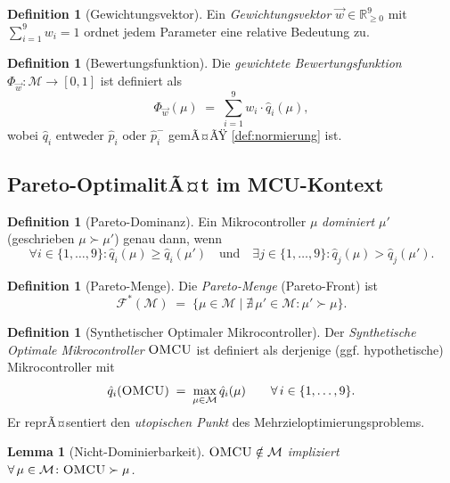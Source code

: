﻿\documentclass[12pt, a4paper]{article}
\theoremstyle{plain}
\newtheorem{lemma}[theorem]{Lemma}
\theoremstyle{definition}
\newtheorem{definition}[theorem]{Definition}
\theoremstyle{remark}
\newcommand{\omcu}{\textsc{OMCU}}
\newcommand{\RR}{\mathbb{R}}
\begin{document}
\begin{definition}[Gewichtungsvektor]
\label{def:gewichtung}
  Ein \emph{Gewichtungsvektor} $\vec{w} \in \RR_{\ge 0}^9$ mit
  $\sum_{i=1}^{9} w_i = 1$ ordnet jedem Parameter eine relative Bedeutung zu.
\end{definition}

\begin{definition}[Bewertungsfunktion]
\label{def:bewertung}
  Die \emph{gewichtete Bewertungsfunktion} $\Phi_{\vec{w}} \colon
  \mathcal{M} \to [0,1]$ ist definiert als
  \[
    \Phi_{\vec{w}}(\mu) \;=\;
    \sum_{i=1}^{9} w_i \cdot \hat{q}_i(\mu),
  \]
  wobei $\hat{q}_i$ entweder $\hat{p}_i$ oder $\hat{p}_i^{-}$ gemÃ¤ÃŸ
  \cref{def:normierung} ist.
\end{definition}

\subsection{Pareto-OptimalitÃ¤t im MCU-Kontext}

\begin{definition}[Pareto-Dominanz]
\label{def:pareto-dominanz}
  Ein Mikrocontroller $\mu$ \emph{dominiert} $\mu'$ (geschrieben
  $\mu \succ \mu'$) genau dann, wenn
  \[
    \forall i \in \{1,\ldots,9\} \colon \hat{q}_i(\mu) \ge \hat{q}_i(\mu')
    \quad\text{und}\quad
    \exists j \in \{1,\ldots,9\} \colon \hat{q}_j(\mu) > \hat{q}_j(\mu').
  \]
\end{definition}

\begin{definition}[Pareto-Menge]
\label{def:pareto-menge}
  Die \emph{Pareto-Menge} (Pareto-Front) ist
  \[
    \mathcal{F}^*(\mathcal{M}) \;=\;
    \bigl\{ \mu \in \mathcal{M} \;\big|\;
    \nexists\, \mu' \in \mathcal{M} \colon \mu' \succ \mu \bigr\}.
  \]
\end{definition}

\begin{definition}[Synthetischer Optimaler Mikrocontroller]
\label{def:omcu}
  Der \emph{Synthetische Optimale Mikrocontroller} $\omcu{}$ ist definiert als
  derjenige (ggf. hypothetische) Mikrocontroller mit
  \[
    \hat{q}_i(\omcu{}) \;=\; \max_{\mu \in \mathcal{M}} \hat{q}_i(\mu)
    \qquad \forall\, i \in \{1,\ldots,9\}.
  \]
  Er reprÃ¤sentiert den \emph{utopischen Punkt} des
  Mehrzieloptimierungsproblems.
\end{definition}

\begin{lemma}[Nicht-Dominierbarkeit]
\label{lem:nicht-dominierbar}
  $\omcu{} \notin \mathcal{M}$ impliziert
  $\forall\, \mu \in \mathcal{M} \colon \omcu{} \succ \mu$.
\end{lemma}
\end{document}
